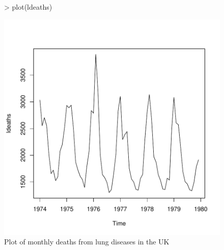 \documentclass[10pt, a4paper]{article} %
\begin{document}
\begin{figure}[h]
\centering
\begin{Schunk}
\begin{Sinput}
> plot(ldeaths)
\end{Sinput}
\end{Schunk}
\includegraphics{FINAL_VERSION-Deathplot}
\caption{Plot of monthly deaths from lung diseases in the UK}
\end{figure}
\\
\end{document}
